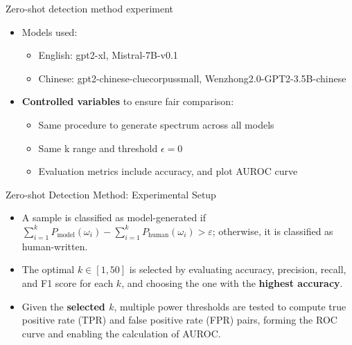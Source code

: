 \documentclass[serif]{beamer}
\begin{document}
\begin{frame}{Zero-shot detection method experiment}
\begin{itemize}
  \item Models used:
  \begin{itemize}
    \item English: gpt2-xl, Mistral-7B-v0.1
    \item Chinese: gpt2-chinese-cluecorpussmall, Wenzhong2.0-GPT2-3.5B-chinese
  \end{itemize}
  \item \textbf{Controlled variables} to ensure fair comparison:
  \begin{itemize}
    \item Same procedure to generate spectrum across all models
    \item Same k range and threshold $\epsilon = 0$
    \item Evaluation metrics include accuracy, and plot AUROC curve 
  \end{itemize}
\end{itemize}
\end{frame}

\begin{frame}{Zero-shot Detection Method: Experimental Setup}
\begin{itemize}
  \item A sample is classified as model-generated if
 \textbf{ \( \sum_{i=1}^k P_{\text{model}}(\omega_i) - \sum_{i=1}^k P_{\text{human}}(\omega_i) > \varepsilon \)}; otherwise, it is classified as human-written.
  \item The optimal \( k \in [1, 50] \) is selected by evaluating accuracy, precision, recall, and F1 score for each \( k \), and choosing the one with the \textbf{highest accuracy}.
  \item Given the \textbf{selected \( k \)}, multiple power thresholds are tested to compute true positive rate (TPR) and false positive rate (FPR) pairs, forming the ROC curve and enabling the calculation of AUROC.

\end{itemize}
\end{frame}


\end{document}
